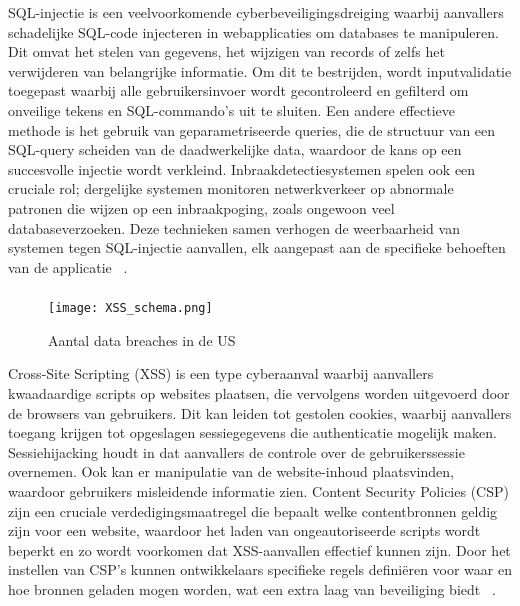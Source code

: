 SQL-injectie is een veelvoorkomende cyberbeveiligingsdreiging waarbij aanvallers schadelijke SQL-code injecteren in webapplicaties om databases te manipuleren. 
Dit omvat het stelen van gegevens, het wijzigen van records of zelfs het verwijderen van belangrijke informatie. Om dit te bestrijden, wordt inputvalidatie 
toegepast waarbij alle gebruikersinvoer wordt gecontroleerd en gefilterd om onveilige tekens en SQL-commando's uit te sluiten. Een andere effectieve methode 
is het gebruik van geparametriseerde queries, die de structuur van een SQL-query scheiden van de daadwerkelijke data, waardoor de kans op een succesvolle 
injectie wordt verkleind. Inbraakdetectiesystemen spelen ook een cruciale rol; dergelijke systemen monitoren netwerkverkeer op abnormale patronen die wijzen op 
een inbraakpoging, zoals ongewoon veel databaseverzoeken. Deze technieken samen verhogen de weerbaarheid van systemen tegen SQL-injectie aanvallen, elk 
aangepast aan de specifieke behoeften van de applicatie ~\autocite{Abdullayev2023}.

\subsubsection{}
\label{sec:Cross-Site Scripting (XSS)}
\begin{figure}
    \centering
    \texttt{[image: XSS\_schema.png]}
    \caption[Aantal data breaches in de US ]{Aantal data breaches in de US }
\end{figure}

Cross-Site Scripting (XSS) is een type cyberaanval waarbij aanvallers kwaadaardige scripts op websites plaatsen, die vervolgens worden uitgevoerd door de 
browsers van gebruikers. Dit kan leiden tot gestolen cookies, waarbij aanvallers toegang krijgen tot opgeslagen sessiegegevens die authenticatie mogelijk 
maken. Sessiehijacking houdt in dat aanvallers de controle over de gebruikerssessie overnemen. Ook kan er manipulatie van de website-inhoud plaatsvinden, 
waardoor gebruikers misleidende informatie zien. Content Security Policies (CSP) zijn een cruciale verdedigingsmaatregel die bepaalt welke contentbronnen 
geldig zijn voor een website, waardoor het laden van ongeautoriseerde scripts wordt beperkt en zo wordt voorkomen dat XSS-aanvallen effectief kunnen zijn. 
Door het instellen van CSP's kunnen ontwikkelaars specifieke regels definiëren voor waar en hoe bronnen geladen mogen worden, wat een extra laag van beveiliging
biedt ~\autocite{Weamie2022}.

